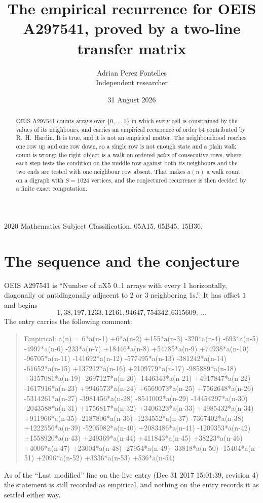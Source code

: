 \documentclass[11pt,a4paper]{article}
\title{The empirical recurrence for OEIS A297541, proved by a two-line transfer matrix}
\author{Adrian Perez Fontelles\\ \small Independent researcher}
\date{31 August 2026}
\theoremstyle{plain}
\theoremstyle{definition}
\begin{document}
\maketitle

\begin{abstract}
OEIS A297541 counts arrays over $\{0,\dots,1\}$ in which every cell is constrained by the
values of its neighbours, and carries an empirical recurrence of order $54$ contributed
by R.~H.~Hardin. It is true, and it is not an empirical matter. The neighbourhood reaches one
row up and one row down, so a single row is not enough state and a plain walk count
is wrong; the right object is a walk on ordered \emph{pairs} of consecutive rows, where
each step tests the condition on the middle row against both its neighbours and the two
ends are tested with one neighbour row absent. That makes $a(n)$ a walk count on a digraph
with $S=1024$ vertices, and the conjectured recurrence is then decided by a finite exact
computation.
\end{abstract}

\noindent\small 2020 Mathematics Subject Classification. 05A15, 05B45, 15B36.\normalsize

\section{The sequence and the conjecture}

OEIS A297541 is ``Number of nX5 0..1 arrays with every 1 horizontally, diagonally or antidiagonally adjacent to 2 or 3 neighboring 1s.''. It has offset $1$ and begins
\[
1, 38, 197, 1233, 12161, 94647, 754342, 6315609,\ \dots
\]
The entry carries the following comment:
\begin{quote}\small
Empirical: a(n) = 6*a(n-1) +6*a(n-2) +155*a(n-3) -320*a(n-4) -693*a(n-5) -4997*a(n-6) -233*a(n-7) +18446*a(n-8) +54785*a(n-9) +74938*a(n-10) -96705*a(n-11) -141692*a(n-12) -577495*a(n-13) -381242*a(n-14) -61652*a(n-15) +137212*a(n-16) +2109779*a(n-17) -985889*a(n-18) +3157081*a(n-19) -2697127*a(n-20) -1446343*a(n-21) +4917847*a(n-22) -1617916*a(n-23) +9946573*a(n-24) +6569073*a(n-25) +7562648*a(n-26) -5314261*a(n-27) -3981456*a(n-28) -8541002*a(n-29) -14454297*a(n-30) -2043588*a(n-31) +1756817*a(n-32) +3406323*a(n-33) +4985432*a(n-34) +911966*a(n-35) -2187806*a(n-36) -1234552*a(n-37) -7367402*a(n-38) +1222556*a(n-39) -5205982*a(n-40) +2083486*a(n-41) -1209353*a(n-42) +1558920*a(n-43) +249369*a(n-44) +411843*a(n-45) +38223*a(n-46) +4006*a(n-47) +23004*a(n-48) -27954*a(n-49) -33818*a(n-50) -15404*a(n-51) +2096*a(n-52) +3336*a(n-53) +536*a(n-54)
\end{quote}
As of the ``Last modified'' line on the live entry (Dec 31 2017 15:01:39, revision 4) the statement is
still recorded as empirical, and nothing on the entry records it as settled either way.
\end{document}
